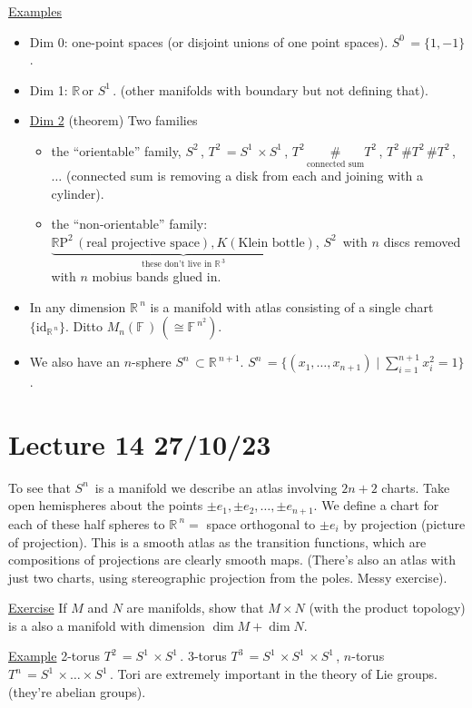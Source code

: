 \documentclass[12pt,a4paper]{article}
\newcommand{\rR}{\ensuremath{\mathbb{R}\,}}
\newcommand{\fF}{\ensuremath{\mathbb{F}\,}}
\newcommand{\mnf}{\ensuremath{M_n(\fF)\,}}
\newcommand{\sph}[1]{\ensuremath{S^{#1}}\,}
\newcommand{\tor}[1]{\ensuremath{T^{#1}}\,}
\newcommand{\rpk}[1]{\ensuremath{\mathbb{R}\mathrm{P}^{#1}}\,}
\newcommand{\ul}[1]{\underline{#1}}
\begin{document}
\ul{Examples} 
\begin{itemize}
\item Dim 0: one-point spaces (or disjoint unions of one point spaces). $\sph{0}=\{1,-1\}$. 
\item Dim 1: \rR or \sph{1}. (other manifolds with boundary but not defining that).
\item \ul{Dim 2} (theorem) Two families
\begin{itemize}
\item the ``orientable'' family, \sph{2}, $\tor{2}=\sph{1}\times \sph{1}$, $\tor{2}\underset{\text{connected sum}}{\#}\tor{2}$,  $\tor{2}\#\tor{2}\# \tor{2}$, $\ldots$ (connected sum is removing a disk from each and joining with a cylinder).
\item the ``non-orientable'' family: $\underbrace{\rpk{2} (\text{real projective space}), K (\text{Klein bottle})}_{\text{these don't live in }\rR^3}$, $\sph{2}$ with $n$ discs removed with $n$ mobius bands glued in.
\end{itemize}
\item In any dimension $\rR^n$ is a manifold with atlas consisting of a single chart $\{\mathrm{id}_{\rR^n}\}$. Ditto $\mnf (\cong \fF^{n^2})$. 
\item We also have an $n$-sphere $\sph{n}\subset \rR^{n+1}$. $\sph{n}=\{(x_1,\ldots,x_{n+1})\mid \sum\limits_{i=1}^{n+1}x_i^2=1\}$.
\end{itemize}

\section{Lecture 14 27/10/23}

To see that \sph{n} is a manifold we describe an atlas involving $2n+2$ charts. Take open hemispheres about the points $\pm e_1, \pm e_2, \ldots,\pm e_{n+1}$. We define a chart for each of these half spheres to $\rR^n = $ space orthogonal to $\pm e_i$ by projection (picture of projection). This is a smooth atlas as the transition functions, which are compositions of projections are clearly smooth maps. (There's also an atlas with just two charts, using stereographic projection from the poles. Messy exercise).

\ul{Exercise} If $M$ and $N$ are manifolds, show that $M\times N$ (with the product topology) is a also a manifold with dimension $\dim M +\dim N$.

\ul{Example} 2-torus $\tor{2}=\sph{1}\times \sph{1}$. 3-torus $\tor{3}=\sph{1}\times \sph{1}\times \sph{1}$, $n$-torus $\tor{n}=\sph{1}\times \ldots \times \sph{1}$. Tori are extremely important in the theory of Lie groups.  (they're abelian groups).
\end{document}
